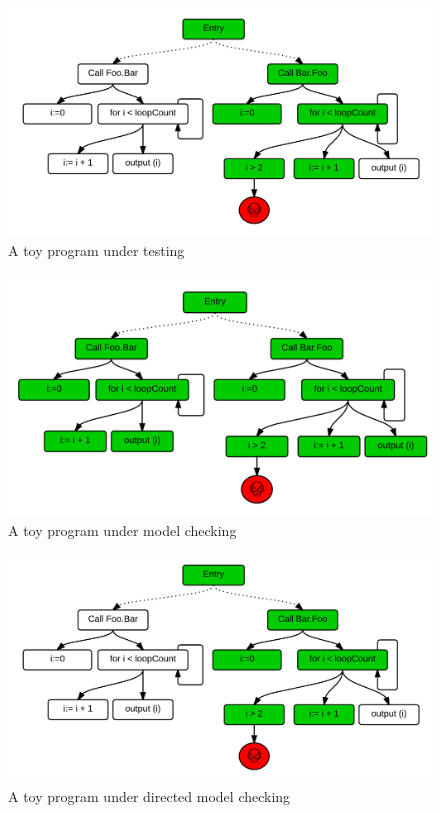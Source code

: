 \documentclass[times]{smrauth}
\begin{document}
\begin{figure}[h!]
  \centering
    \includegraphics[scale=0.7]{media/dmc.png}
    \caption{A toy program under testing
    \label{fig:testing-toy}}
\end{figure}

\begin{figure}[h!]
  \centering
    \includegraphics[scale=0.7]{media/mc.png}
    \caption{A toy program under model checking
    \label{fig:checking-toy}}
\end{figure}

\begin{figure}[h!]
  \centering
    \includegraphics[scale=0.7]{media/dmc.png}
    \caption{A toy program under directed model checking
    \label{fig:dchecking-toy}}
\end{figure}
\end{document}
